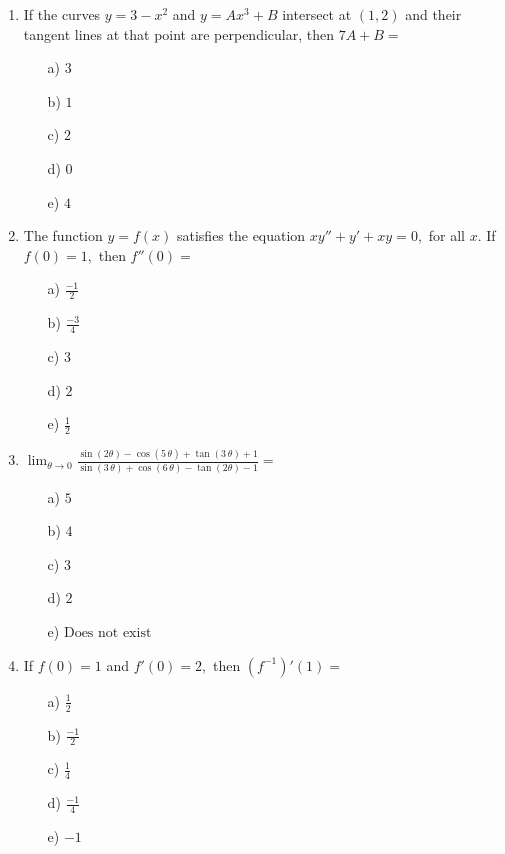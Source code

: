 \documentclass[dvips, 12pt,a4paper]{article}
\begin{document}
\begin{enumerate}
\newpage


\item If the curves $y=3-x^2$ and $y=Ax^3+B$ intersect at $(1,2)$ and their tangent lines at that point are perpendicular, then $7A+B=$
\\[0.2in]
\begin{itemize}
\item [a)]$3$
\item [b)]$1$
\item [c)]$2$
\item [d)]$0$
\item [e)]$4$
\end{itemize}

\vspace{0.8in}

\item The function $y=f(x)$ satisfies the equation $xy''+y'+xy=0,$ for all $x$. If $f(0)=1,$ then $f''(0)=$
\\[0.2in]
\begin{itemize}
\item [a)]$\displaystyle \frac{-1}{2}$
\item [b)]$\displaystyle \frac{-3}{4}$
\item [c)]$3$
\item [d)]$2$
\item [e)]$\displaystyle \frac{1}{2}$
\end{itemize}

\newpage


\item $\displaystyle \lim_{\theta\rightarrow 0} \frac{\sin(2\theta)-\cos(5\,\theta)+\tan(3\,\theta)+1}{\sin(3\,\theta)+\cos(6\,\theta)-\tan(2\theta)-1}=$
\\[0.2in]
\begin{itemize}
\item [a)]$5$
\item [b)]$4$
\item [c)]$3$
\item [d)]$2$
\item [e)]$\mbox{Does not exist}$
\end{itemize}

\vspace{0.8in}

\item If $f(0)=1$ and $f'(0)=2,$ then $(f^{-1})'(1)=$
\\[0.2in]
\begin{itemize}
\item [a)]$\displaystyle \frac{1}{2}$
\item [b)]$\displaystyle \frac{-1}{2}$
\item [c)]$\displaystyle \frac{1}{4}$
\item [d)]$\displaystyle \frac{-1}{4}$
\item [e)]$-1$
\end{itemize}



\end{enumerate}
\end{document}

